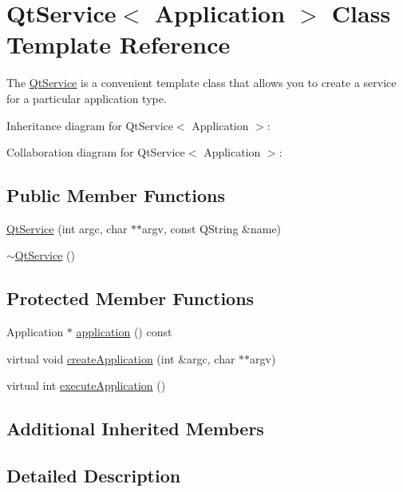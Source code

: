 \hypertarget{class_qt_service}{}\section{Qt\+Service$<$ Application $>$ Class Template Reference}
\label{class_qt_service}


The \mbox{\hyperlink{class_qt_service}{Qt\+Service}} is a convenient template class that allows you to create a service for a particular application type.  




Inheritance diagram for Qt\+Service$<$ Application $>$\+:


Collaboration diagram for Qt\+Service$<$ Application $>$\+:
\subsection*{Public Member Functions}
\begin{DoxyCompactItemize}
\item 
\mbox{\hyperlink{class_qt_service_aca39304919f89cbb95fca64f44a761ae}{Qt\+Service}} (int argc, char $\ast$$\ast$argv, const Q\+String \&name)
\item 
\mbox{\hyperlink{class_qt_service_a96af408261dfa13bd8034f67949d6c2d}{$\sim$\+Qt\+Service}} ()
\end{DoxyCompactItemize}
\subsection*{Protected Member Functions}
\begin{DoxyCompactItemize}
\item 
Application $\ast$ \mbox{\hyperlink{class_qt_service_a39743415a6ece5c7c6e6b5b01289c00b}{application}} () const
\item 
virtual void \mbox{\hyperlink{class_qt_service_a50aa2079345abfd0b1284be47e245b0b}{create\+Application}} (int \&argc, char $\ast$$\ast$argv)
\item 
virtual int \mbox{\hyperlink{class_qt_service_a84f5f60304117e1f11cc0ed16dc0b72e}{execute\+Application}} ()
\end{DoxyCompactItemize}
\subsection*{Additional Inherited Members}


\subsection{Detailed Description}
